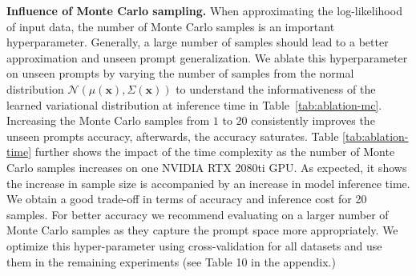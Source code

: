 \documentclass[10pt,twocolumn,letterpaper]{article}
\newcommand{\x}{\mathbf{x}}
\begin{document}
\begin{table}[t]
\centering
\caption{\textbf{Influence of Monte Carlo sampling} on EuroSAT. Increasing samples increases the time complexity at inference, with a good trade-off for 20 samples (see Table~\ref{tab:ablation-mc}). }
\vspace{-2mm}
\label{tab:ablation-time}

\end{table}

\textbf{Influence of Monte Carlo sampling.}
When approximating the log-likelihood of input data, the number of Monte Carlo samples is an important hyperparameter. Generally, a large number of samples should lead to a better approximation and unseen prompt generalization. We ablate this hyperparameter on unseen prompts by varying the number of samples from the normal distribution $\mathcal{N}( \mu(\x), \Sigma(\x ))$ to understand the informativeness of the learned variational distribution at inference time in Table~\ref{tab:ablation-mc}. Increasing the Monte Carlo samples from $1$ to $20$  consistently improves the unseen prompts accuracy, afterwards, the accuracy saturates. 
Table \ref{tab:ablation-time} further shows the impact of the time complexity as the number of Monte Carlo samples increases on one
NVIDIA RTX 2080ti GPU. As expected, it shows the increase in sample size is accompanied by an increase in model inference time. We obtain a good trade-off in terms of accuracy and inference cost for 20 samples. For better accuracy we recommend evaluating on a larger number of Monte Carlo samples as they capture the prompt space more appropriately. We optimize this hyper-parameter using cross-validation for all datasets and use them in the remaining experiments (see Table 10 in the appendix.) 
\end{document}

